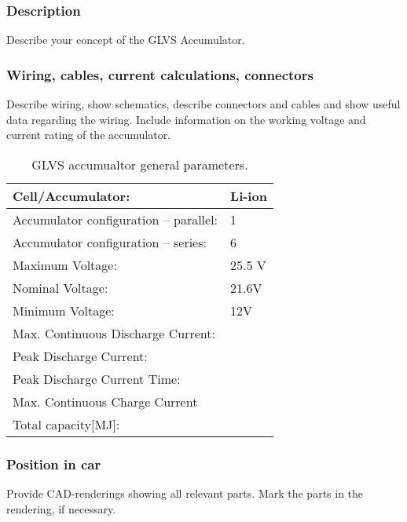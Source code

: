 \subsubsection{Description}
Describe your concept of the GLVS Accumulator.

\subsubsection{Wiring, cables, current calculations, connectors}
Describe wiring, show schematics, describe connectors and cables and show useful data regarding the wiring.  Include information on the working voltage and current rating of the accumulator.

\begin{table}[H]
	\centering
	\caption{GLVS accumualtor general parameters.}
	\begin{tabularx}{\textwidth}{|X|X|}\hline
		Cell/Accumulator: & Li-ion\\[\TableSize]\hline
		Accumulator configuration – parallel: & 1 \\[\TableSize]\hline
		Accumulator configuration – series: & 6 \\[\TableSize]\hline
		Maximum Voltage: & 25.5 V \\[\TableSize]\hline
		Nominal Voltage: & 21.6V \\[\TableSize]\hline
		Minimum Voltage: & 12V \\[\TableSize]\hline
		Max. Continuous Discharge Current: &  \\[\TableSize]\hline
		Peak Discharge Current: &  \\[\TableSize]\hline
		Peak Discharge Current Time: &  \\[\TableSize]\hline
		Max. Continuous Charge Current &  \\[\TableSize]\hline
		Total capacity[MJ]: &  \\[\TableSize]\hline
	\end{tabularx}%
	\label{tab:LVbatt-general}%
\end{table}%

\subsubsection{Position in car}
Provide CAD-renderings showing all relevant parts. Mark the parts in the rendering, if necessary.